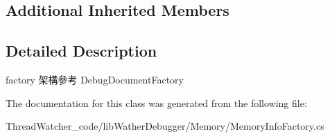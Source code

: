 \subsection*{Additional Inherited Members}


\subsection{Detailed Description}
factory 架構參考 Debug\+Document\+Factory 



The documentation for this class was generated from the following file\+:\begin{DoxyCompactItemize}
\item 
Thread\+Watcher\+\_\+code/lib\+Wather\+Debugger/\+Memory/Memory\+Info\+Factory.\+cs\end{DoxyCompactItemize}
